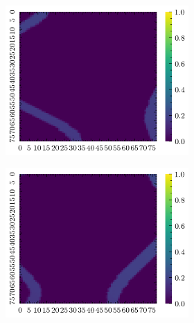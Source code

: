 \documentclass[../document.tex]{subfiles}
\begin{document}
\begin{figure}[H]
\begin{subfigure}[b]{1\textwidth}
\begin{subfigure}[b]{0.19\textwidth}
    \includegraphics[width=\linewidth]{../img/bars1-example-patches/2d/2.png}    
    \end{subfigure}  
    \begin{subfigure}[b]{0.19\textwidth}
    \includegraphics[width=\linewidth]{../img/bars1-example-patches/2d/4.png} 
    \end{subfigure}
    \begin{subfigure}[b]{0.19\textwidth}

\end{subfigure}
\end{subfigure}
\end{figure}
\end{document}
